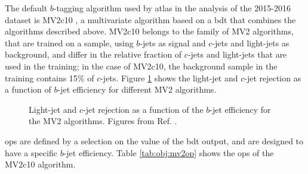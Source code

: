 The default $b$-tagging algorithm used by \gls{atlas} in the analysis of the 2015-2016 dataset is MV2c10 
\cite{ATL-PHYS-PUB-2015-022,ATL-PHYS-PUB-2016-012}, 
a multivariate algorithm based on a \gls{bdt} that combines the algorithms described above. 
MV2c10 belongs to the family of MV2 algorithms, that are trained on a \ttbar sample, using $b$-jets as signal and $c$-jets and light-jets as background, and differ in the relative fraction of $c$-jets and light-jets that are
used in the training; in the case of MV2c10, the background sample in the training contains 15\% of $c$-jets.
Figure \ref{fig:obj:mv2} shows the light-jet and $c$-jet rejection as a function of $b$-jet efficiency for different MV2 algorithms.

\begin{figure}[h]
\begin{center}
\end{center}
 \caption{Light-jet  and $c$-jet  rejection as a function of the $b$-jet efficiency for the MV2 algorithms. Figures from Ref. \cite{ATL-PHYS-PUB-2016-012}.}
  \label{fig:obj:mv2}
\end{figure}

\glspl{op} are defined by a selection on the value of the \gls{bdt} output, and are designed to have a specific $b$-jet efficiency.
Table \ref{tab:obj:mv2op} shows the \glspl{op} of the MV2c10 algorithm.

